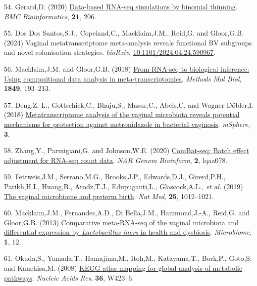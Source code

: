 \documentclass[
]{article}
\newlength{\cslhangindent}
\newenvironment{CSLReferences}[2] %
 {\begin{list}{}{%
  \setlength{\itemindent}{0pt}
  \setlength{\leftmargin}{0pt}
  \setlength{\parsep}{0pt}
  \ifodd #1
   \setlength{\leftmargin}{\cslhangindent}
   \setlength{\itemindent}{-1\cslhangindent}
  \fi
  \setlength{\itemsep}{#2\baselineskip}}}
 {\end{list}}
\begin{document}
\begin{CSLReferences}{1}{1}
54. Gerard,D. (2020)
\href{https://doi.org/10.1186/s12859-020-3450-9}{Data-based RNA-seq
simulations by binomial thinning}. \emph{BMC Bioinformatics},
\textbf{21}, 206.

55. Dos Dos Santos,S.J., Copeland,C., Macklaim,J.M., Reid,G. and
Gloor,G.B. (2024) Vaginal metatranscriptome meta-analysis reveals
functional BV subgroups and novel colonisation strategies.
\emph{bioRxiv},
\href{https://doi.org/10.1101/2024.04.24.590967}{10.1101/2024.04.24.590967}.

56. Macklaim,J.M. and Gloor,G.B. (2018)
\href{https://doi.org/10.1007/978-1-4939-8728-3/_13}{From {RNA}-seq to
biological inference: Using compositional data analysis in
meta-transcriptomics}. \emph{Methods Mol Biol}, \textbf{1849}, 193--213.

57. Deng,Z.-L., Gottschick,C., Bhuju,S., Masur,C., Abels,C. and
Wagner-Döbler,I. (2018)
\href{https://doi.org/10.1128/mSphereDirect.00262-18}{Metatranscriptome
analysis of the vaginal microbiota reveals potential mechanisms for
protection against metronidazole in bacterial vaginosis}.
\emph{mSphere}, \textbf{3}.

58. Zhang,Y., Parmigiani,G. and Johnson,W.E. (2020)
\href{https://doi.org/10.1093/nargab/lqaa078}{ComBat-seq: Batch effect
adjustment for RNA-seq count data}. \emph{NAR Genom Bioinform},
\textbf{2}, lqaa078.

59. Fettweis,J.M., Serrano,M.G., Brooks,J.P., Edwards,D.J., Girerd,P.H.,
Parikh,H.I., Huang,B., Arodz,T.J., Edupuganti,L., Glascock,A.L.,
\emph{et al.} (2019)
\href{https://doi.org/10.1038/s41591-019-0450-2}{The vaginal microbiome
and preterm birth}. \emph{Nat Med}, \textbf{25}, 1012--1021.

60. Macklaim,J.M., Fernandes,A.D., Di Bella,J.M., Hammond,J.-A., Reid,G.
and Gloor,G.B. (2013)
\href{https://doi.org/10.1186/2049-2618-1-12}{Comparative meta-{RNA}-seq
of the vaginal microbiota and differential expression by
\emph{{L}actobacillus iners} in health and dysbiosis}.
\emph{Microbiome}, \textbf{1}, 12.

61. Okuda,S., Yamada,T., Hamajima,M., Itoh,M., Katayama,T., Bork,P.,
Goto,S. and Kanehisa,M. (2008)
\href{https://doi.org/10.1093/nar/gkn282}{KEGG atlas mapping for global
analysis of metabolic pathways}. \emph{Nucleic Acids Res}, \textbf{36},
W423--6.


\end{CSLReferences}
\end{document}

